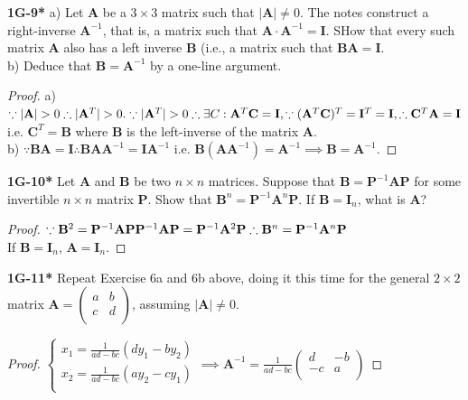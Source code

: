 \documentclass{article}
\begin{document}
%
%
\textbf{1G-9*} a) Let $\mathbf{A}$ be a $3 \times 3$ matrix such that $|\mathbf{A}| \neq 0$. The notes construct a right-inverse $\mathbf{A}^{-1}$, that is, a matrix such that $\mathbf{A} \cdot \mathbf{A}^{-1} = \mathbf{I}$. SHow that every such matrix $\mathbf{A}$ also has a left inverse $\mathbf{B}$ (i.e., a matrix such that $\mathbf{BA} = \mathbf{I}$.
\\ b) Deduce that $\mathbf{B} = \mathbf{A}^{-1}$ by a one-line argument.
%
%
\begin{proof}
a) $\because |\mathbf{A}| > 0 \therefore |\mathbf{A}^T| > 0.
\\ \because |\mathbf{A}^T| > 0 \therefore \exists C: \mathbf{A}^T \mathbf{C} = \mathbf{I}, \because (\mathbf{A}^T \mathbf{C})^T = \mathbf{I}^T = \mathbf{I}, \therefore \mathbf{C}^T \mathbf{A} = \mathbf{I}
$ i.e. $\mathbf{C}^T = \mathbf{B}$ where $\mathbf{B}$ is the left-inverse of the matrix $\mathbf{A}$.
\\ b) $\because \mathbf{BA} = \mathbf{I} \therefore \mathbf{BA}\mathbf{A}^{-1} = \mathbf{I}\mathbf{A}^{-1}$ i.e. $\mathbf{B}(\mathbf{A}\mathbf{A}^{-1}) = \mathbf{A}^{-1} \implies \mathbf{B} = \mathbf{A}^{-1}$.
\end{proof}
%
%
\textbf{1G-10*} Let $\mathbf{A}$ and $\mathbf{B}$ be two $n \times n$ matrices. Suppose that $\mathbf{B} = \mathbf{P}^{-1}\mathbf{A}\mathbf{P}$ for some invertible $n \times n$ matrix $\mathbf{P}$. Show that $\mathbf{B}^n = \mathbf{P}^{-1} \mathbf{A}^n \mathbf{P}$. If $\mathbf{B} = \mathbf{I}_n$, what is $\mathbf{A}$?
%
%
\begin{proof}
$\because \mathbf{B}^2 = \mathbf{P}^{-1}\mathbf{A}\mathbf{P}\mathbf{P}^{-1}\mathbf{A}\mathbf{P} = \mathbf{P}^{-1}\mathbf{A}^2 \mathbf{P}
\\
\therefore \mathbf{B}^{n} = \mathbf{P}^{-1}\mathbf{A}^{n}\mathbf{P}$
\\
If $\mathbf{B} = \mathbf{I}_n$, $\mathbf{A} = \mathbf{I}_n$.
\end{proof}
%
%
\textbf{1G-11*} Repeat Exercise 6a and 6b above, doing it this time for the general $2 \times 2$ matrix $\mathbf{A} = \begin{pmatrix}
a & b \\
c & d \\
\end{pmatrix}
$, assuming $|\mathbf{A}| \neq 0$.
%
%
\begin{proof}
$
\begin{cases}
x_1 = \frac{1}{ad-bc} (d y_1 - b y_2) \\
x_2 = \frac{1}{ad-bc} (a y_2 - c y_1) \\
\end{cases}
\implies
\mathbf{A}^{-1} = \frac{1}{ad-bc}\begin{pmatrix}
d & -b \\
-c & a \\
\end{pmatrix}
$
\end{proof}
\end{document}
